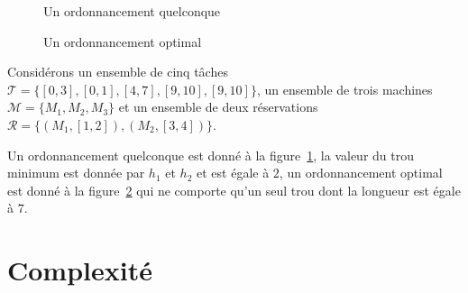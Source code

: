 \begin{figure}
    \begin{center}
        \begin{ordo}[10]{3}{1}{10}


        \end{ordo}
    \end{center}
    \caption{Un ordonnancement quelconque}
    \label{ex1ordquelc}
\end{figure}
            
\begin{figure}
    \begin{center}
        \begin{ordo}[10]{3}{1}{10}


        \end{ordo}
    \end{center}
    \caption{Un ordonnancement optimal}
    \label{ex1ordopt}
\end{figure}

\begin{ex}
    Considérons un ensemble de cinq tâches $\mathcal{T} = \{[0, 3], [0,1], [4,7],
    [9,10], [9,10]\}$, un ensemble de trois machines $\mathcal{M} = \{M_1, M_2, M_3\}$ et un
    ensemble de deux réservations $\mathcal{R} = \{(M_1, [1,2]), (M_2, [3,4])\}$.

    Un ordonnancement quelconque est donné à la figure~\ref{ex1ordquelc}, la valeur du trou minimum
    est donnée par $h_1$ et $h_2$ et est égale à $2$, un ordonnancement optimal est donné à la
    figure~\ref{ex1ordopt} qui ne comporte qu'un seul trou dont la longueur est égale à $7$.
\end{ex}

\section{Complexité}
\label{scomplexite}

